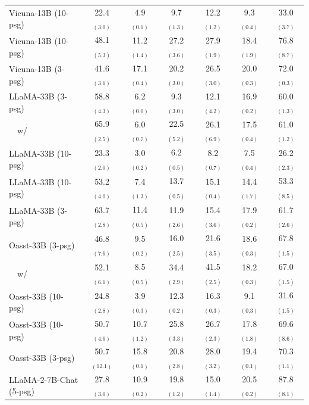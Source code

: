 \documentclass[11pt]{article}
\newcommand{\vani}{{\sc{Vanilla}}}
\newcommand{\summ}{{\sc{Summ}}}
\newcommand{\snippet}{{\sc{Snippet}}}
\newcommand{\rerank}{{\sc{Rerank}}}
\newcommand{\oracle}{{\sc{Oracle}}}
\begin{document}
\begin{table}[h]
\begin{tabular}{lcccccc}
            Vicuna-13B \summ{} (10-psg) & 22.4 $_{(3.0)}$ & 4.9 $_{(0.1)}$ & 9.7 $_{(1.3)}$ & 12.2 $_{(1.2)}$ & 9.3 $_{(0.4)}$ & 33.0 $_{(3.7)}$ \\
            Vicuna-13B \snippet{} (10-psg) & 48.1 $_{(5.3)}$ & 11.2 $_{(1.4)}$ & 27.2 $_{(3.6)}$ & 27.9 $_{(1.9)}$ & 18.4 $_{(1.9)}$ & 76.8 $_{(8.7)}$ \\
            Vicuna-13B \oracle{} (3-psg) & 41.6 $_{(3.1)}$ & 17.1 $_{(0.4)}$ & 20.2 $_{(3.0)}$ & 26.5 $_{(3.0)}$ & 20.0 $_{(0.3)}$ & 72.0 $_{(0.3)}$ \\ \midrule
            LLaMA-33B \vani{} (3-psg) & 58.8 $_{(4.3)}$ & 6.2 $_{(0.0)}$ & 9.3 $_{(3.0)}$ & 12.1 $_{(4.2)}$ & 16.9 $_{(0.2)}$ & 60.0 $_{(1.3)}$ \\
            ~~w/ \rerank & 65.9 $_{(2.5)}$ & 6.0 $_{(0.7)}$ & 22.5 $_{(5.2)}$ & 26.1 $_{(6.9)}$ & 17.5 $_{(0.4)}$ & 61.0 $_{(1.2)}$ \\
            LLaMA-33B \summ{} (10-psg) & 23.3 $_{(2.0)}$ & 3.0 $_{(0.2)}$ & 6.2 $_{(0.5)}$ & 8.2 $_{(0.7)}$ & 7.5 $_{(0.4)}$ & 26.2 $_{(2.3)}$ \\
            LLaMA-33B \snippet{} (10-psg) & 53.2 $_{(4.0)}$ & 7.4 $_{(1.3)}$ & 13.7 $_{(0.5)}$ & 15.1 $_{(0.4)}$ & 14.4 $_{(1.7)}$ & 53.3 $_{(8.5)}$ \\
            LLaMA-33B \oracle{} (3-psg) & 63.7 $_{(2.8)}$ & 11.4 $_{(0.5)}$ & 11.9 $_{(2.6)}$ & 15.4 $_{(3.6)}$ & 17.9 $_{(0.2)}$ & 61.7 $_{(2.6)}$ \\ \midrule
            Oasst-33B \vani{} (3-psg) & 46.8 $_{(7.6)}$ & 9.5 $_{(0.2)}$ & 16.0 $_{(2.5)}$ & 21.6 $_{(3.5)}$ & 18.6 $_{(0.3)}$ & 67.8 $_{(1.5)}$ \\
            ~~w/ \rerank & 52.1 $_{(6.1)}$ & 8.5 $_{(0.5)}$ & 34.4 $_{(2.9)}$ & 41.5 $_{(2.5)}$ & 18.2 $_{(0.3)}$ & 67.0 $_{(1.5)}$ \\
            Oasst-33B \summ{} (10-psg) & 24.8 $_{(2.8)}$ & 3.9 $_{(0.3)}$ & 12.3 $_{(0.2)}$ & 16.3 $_{(0.3)}$ & 9.1 $_{(0.3)}$ & 31.6 $_{(1.5)}$ \\
            Oasst-33B \snippet{} (10-psg) & 50.7 $_{(4.6)}$ & 10.7 $_{(1.2)}$ & 25.8 $_{(3.3)}$ & 26.7 $_{(2.3)}$ & 17.8 $_{(1.8)}$ & 69.6 $_{(8.6)}$ \\
            Oasst-33B \oracle{} (3-psg) & 50.7 $_{(12.1)}$ & 15.8 $_{(0.1)}$ & 20.8 $_{(2.8)}$ & 28.0 $_{(3.2)}$ & 19.4 $_{(0.1)}$ & 70.3 $_{(1.1)}$ \\ 
            \midrule
            LLaMA-2-7B-Chat \vani{} (5-psg) & 27.8 $_{(3.0)}$&10.9 $_{(0.2)}$&19.8 $_{(1.2)}$&15.0 $_{(1.4)}$&20.5 $_{(0.2)}$&87.8 $_{(8.1)}$\\

\end{tabular}
\end{table}
\end{document}
